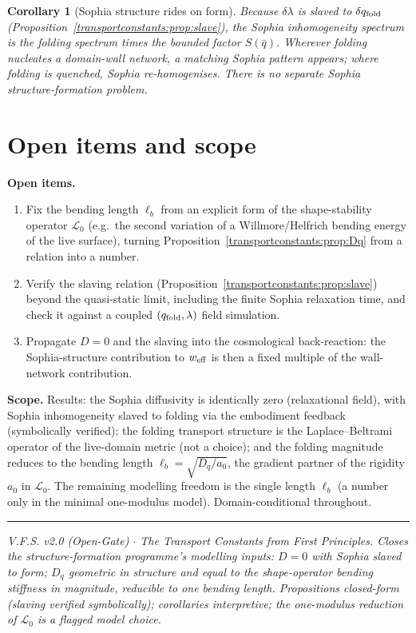 \documentclass[11pt,a4paper,oneside]{book}
\newcommand{\qf}{q_{\rm fold}}
\newcommand{\Dq}{D_q}
\newcommand{\lb}{\ell_b}
\newcommand{\Lop}{\mathcal{L}_0}
\theoremstyle{plain}
\newtheorem{corollary}{Corollary}[chapter]
\theoremstyle{definition}
\theoremstyle{remark}
\begin{document}
\begin{corollary}[Sophia structure rides on form]
Because $\delta\lambda$ is slaved to $\delta\qf$ (Proposition~\ref{transportconstants:prop:slave}), the Sophia inhomogeneity
spectrum is the folding spectrum times the bounded factor $S(\bar q)$. Wherever folding nucleates a
domain-wall network, a matching Sophia pattern appears; where folding is quenched, Sophia re-homogenises.
There is no separate Sophia structure-formation problem.
\end{corollary}

\section{Open items and scope}

\textbf{Open items.}
\begin{enumerate}[leftmargin=1.6em,itemsep=2pt]
\item Fix the bending length $\lb$ from an explicit form of the shape-stability operator $\Lop$ (e.g.\
the second variation of a Willmore/Helfrich bending energy of the live surface), turning
Proposition~\ref{transportconstants:prop:Dq} from a relation into a number.
\item Verify the slaving relation (Proposition~\ref{transportconstants:prop:slave}) beyond the quasi-static limit, including
the finite Sophia relaxation time, and check it against a coupled $(\qf,\lambda)$ field simulation.
\item Propagate $D=0$ and the slaving into the cosmological back-reaction: the Sophia-structure
contribution to $w_{\rm eff}$ is then a fixed multiple of the wall-network contribution.
\end{enumerate}

\textbf{Scope.} Results: the Sophia diffusivity is identically zero (relaxational field), with Sophia
inhomogeneity slaved to folding via the embodiment feedback (symbolically verified); the folding
transport structure is the Laplace--Beltrami operator of the live-domain metric (not a choice); and the
folding magnitude reduces to the bending length $\lb=\sqrt{\Dq/a_0}$, the gradient partner of the rigidity
$a_0$ in $\Lop$. The remaining modelling freedom is the single length $\lb$ (a number only in the minimal
one-modulus model). Domain-conditional throughout.

\vspace{0.5em}
\hrule
\smallskip
\noindent\footnotesize\emph{V.F.S. v2.0 (Open-Gate) $\cdot$ The Transport Constants from First Principles.
Closes the structure-formation programme's modelling inputs: $D=0$ with Sophia slaved to form; $\Dq$
geometric in structure and equal to the shape-operator bending stiffness in magnitude, reducible to one
bending length. Propositions closed-form (slaving verified symbolically); corollaries interpretive; the
one-modulus reduction of $\Lop$ is a flagged model choice.}
\end{document}
